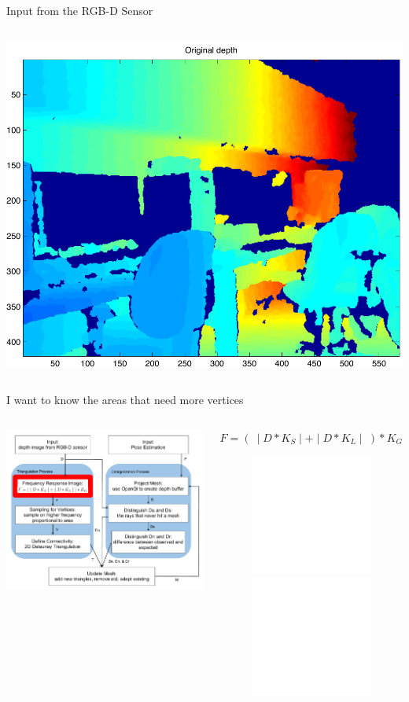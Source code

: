 \documentclass{beamer}
\begin{document}
\begin{frame}{Input from the RGB-D Sensor}
\begin{columns}
\begin{center}
  \includegraphics[width=\textwidth]{m_depth.pdf} 
  \end{center}
\end{columns}
\end{frame}

\begin{frame}{I want to know the areas that need more vertices}
\vspace{-.1in}
\begin{columns}
  \begin{center}
  \includegraphics[width=\textwidth]{SDfreq.pdf} 
  \end{center}
  \begin{center}
  $F=(\ \mid D \ast K_S \mid + \mid D \ast K_L \mid \ ) \ast K_G$
  \vspace{-.1in}
  \begin{figure}
  \includegraphics<1>[width=\textwidth]{m_freq.pdf} 
  \includegraphics<2>[width=\textwidth]{m_freqn.pdf} 
  \end{figure}
  \end{center}
\end{columns}
\end{frame}
\end{document}
